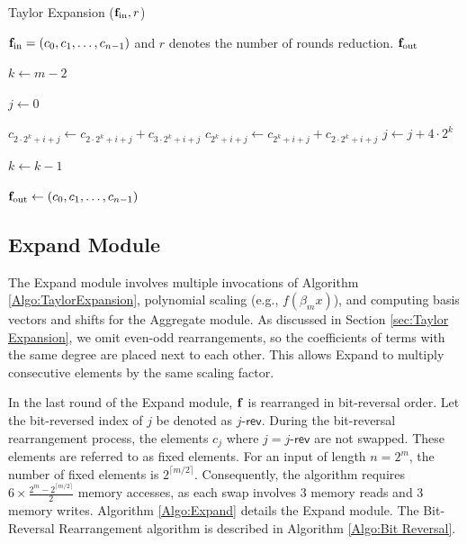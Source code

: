 \begin{algorithm}[h]
	\caption{Taylor Expansion (${\bf{f}}_\text{in}, r$)}
	\label{Algo:TaylorExpansion}
	\begin{algorithmic}[1]
		\Require ${\bf{f}}_\text{in} = (c_0,c_1,\ldots,c_{n-1})$ and $r$ denotes the number of rounds reduction.
		\Ensure ${\bf{f}}_\text{out}$
		
		\State $k \gets m - 2$
		
		\State $j \gets 0$
		
		\State $c_{2\cdot2^k + i + j} \gets c_{2\cdot2^k + i + j} + c_{3\cdot2^k + i + j}$
		\State $c_{2^k + i + j} \gets c_{2^k + i + j} + c_{2\cdot2^k + i + j}$
		\EndFor
		\State $j \gets j + 4\cdot2^k$ 
		\EndWhile
		
		\State $k \gets k - 1$
		\EndWhile
		
		\State \Return ${\bf{f}}_\text{out} \gets (c_0,c_1,\ldots,c_{n-1})$
	\end{algorithmic}
\end{algorithm}


\subsection{Expand Module}

The \textsf{Expand} module involves multiple invocations of Algorithm \ref{Algo:TaylorExpansion}, polynomial scaling (e.g., $f(\beta_m x)$), and computing basis vectors and shifts for the \textsf{Aggregate} module. 
As discussed in Section \ref{sec:Taylor Expansion}, we omit even-odd rearrangements, 
so the coefficients of terms with the same degree are placed next to each other. This allows \textsf{Expand} to multiply consecutive elements by the same scaling factor. 

In the last round of the \textsf{Expand} module, ${\bf{f}}$ is rearranged in bit-reversal order. Let the bit-reversed index of $j$ be denoted as $j\text{-}\mathsf{rev}$. During the bit-reversal rearrangement process, the elements \( c_j \) where \( j = j\text{-}\mathsf{rev} \) are not swapped. These elements are referred to as fixed elements. For an input of length \( n = 2^m \), the number of fixed elements is \( 2^{\lceil m/2 \rceil} \). Consequently, the algorithm requires \( 6 \times \frac{2^m - 2^{\lceil m/2 \rceil}}{2} \) memory accesses, as each swap involves 3 memory reads and 3 memory writes. Algorithm \ref{Algo:Expand} details the \textsf{Expand} module. The Bit-Reversal Rearrangement algorithm is described in Algorithm \ref{Algo:Bit Reversal}.


